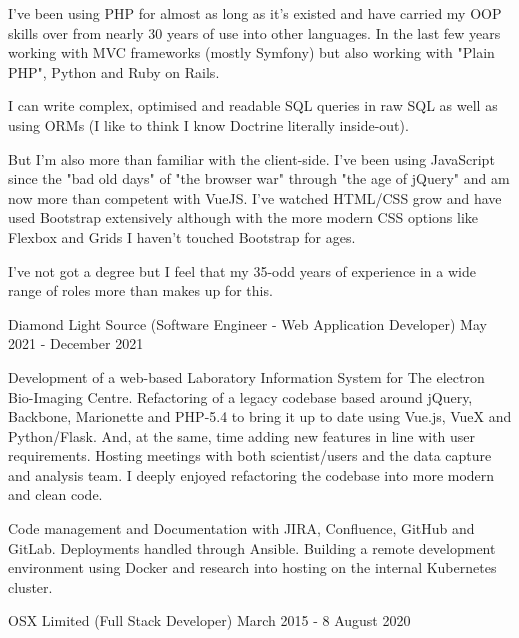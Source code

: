 \topHeading{}



I've been using PHP for almost as long as it's existed
and have carried my OOP skills over from nearly 30 years
of use into other languages.
In the last few years working with MVC frameworks (mostly Symfony)
but also working with "Plain PHP", Python and Ruby on Rails.

I can write complex, optimised and readable SQL queries in raw SQL as well
as using ORMs (I like to think I know Doctrine literally inside-out).

But I'm also more than familiar with the client-side. I've been using JavaScript
since the "bad old days" of "the browser war" through "the age of jQuery" and
am now more than competent with VueJS. I've watched HTML/CSS grow and have used
Bootstrap extensively although with the more modern CSS options like Flexbox
and Grids I haven't touched Bootstrap for ages.

I've not got a degree but I feel that my 35-odd years of experience in a wide
range of roles more than makes up for this.


\jobHeading

\jobHeading
    {Diamond Light Source (Software Engineer - Web Application Developer)}
    {May 2021 - December 2021}

Development of a web-based Laboratory Information System for
The electron Bio-Imaging Centre. Refactoring of a legacy codebase based around
jQuery, Backbone, Marionette and PHP-5.4 to bring it up to date using Vue.js,
VueX and Python/Flask. And, at the same, time adding new features in line with
user requirements. Hosting meetings with both scientist/users and the data
capture and analysis team. I deeply enjoyed refactoring the codebase into
more modern and clean code.

Code management and Documentation with JIRA, Confluence, GitHub and GitLab.
Deployments handled through Ansible.
Building a remote development environment using Docker and research into
hosting on the internal Kubernetes cluster.

\jobHeading
    {OSX Limited (Full Stack Developer)}
    {March 2015 - 8 August 2020}

